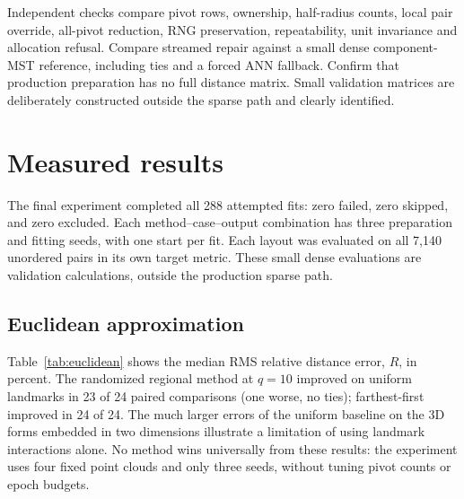 \documentclass[11pt,letterpaper]{article}
\begin{document}
Independent checks compare pivot rows, ownership, half-radius counts, local
pair override, all-pivot reduction, RNG preservation, repeatability, unit
invariance and allocation refusal. Compare streamed repair against a small dense
component-MST reference, including ties and a forced ANN fallback. Confirm that
production preparation has no full distance matrix. Small validation matrices
are deliberately constructed outside the sparse path and clearly identified.


\clearpage\section{Measured results}
The final experiment completed all 288 attempted fits: zero failed, zero skipped,
and zero excluded. Each method--case--output combination has three preparation
and fitting seeds, with one start per fit. Each layout was evaluated on all
7,140 unordered pairs in its own target metric. These small dense evaluations
are validation calculations, outside the production sparse path.

\subsection{Euclidean approximation}
Table~\ref{tab:euclidean} shows the median RMS relative distance error, $R$, in
percent. The randomized regional method at $q=10$ improved on uniform landmarks
in 23 of 24 paired comparisons (one worse, no ties); farthest-first improved in
24 of 24. The much larger errors of the uniform baseline on the 3D forms embedded
in two dimensions illustrate a limitation of using landmark interactions alone.
No method wins universally from these results: the experiment uses four fixed
point clouds and only three seeds, without tuning pivot counts or epoch budgets.
\end{document}
